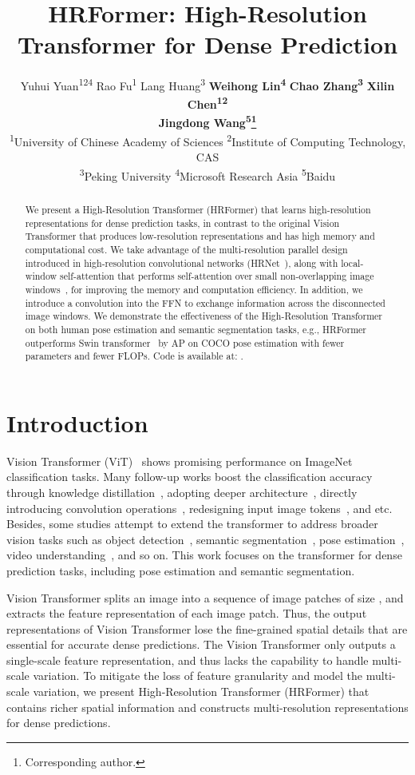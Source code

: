 \documentclass{article}
\title{HRFormer: High-Resolution Transformer for Dense Prediction}
\author{
Yuhui Yuan\textsuperscript{124}
\enskip \enskip 
Rao Fu\textsuperscript{1}
\enskip \enskip
Lang Huang\textsuperscript{3}
\enskip \enskip 
\textbf{Weihong Lin\textsuperscript{4}}
\enskip \enskip 
\textbf{Chao Zhang\textsuperscript{3}}
\enskip \enskip 
\textbf{Xilin Chen\textsuperscript{12}}
\enskip \enskip \\
\textbf{Jingdong Wang\textsuperscript{5}\thanks{Corresponding author.}}
\\
\textsuperscript{1}University of Chinese Academy of Sciences
\enskip\enskip\enskip
\textsuperscript{2}Institute of Computing Technology, CAS \\
\enskip\enskip\enskip
\textsuperscript{3}Peking University
\enskip\enskip\enskip
\textsuperscript{4}Microsoft Research Asia
\enskip\enskip\enskip
\textsuperscript{5}Baidu
}
\begin{document}
\maketitle

\begin{abstract}
  We present a High-Resolution Transformer (HRFormer) that learns high-resolution representations for dense prediction tasks,
  in contrast to the original
  Vision Transformer that produces low-resolution representations and has high memory and computational cost.
  We take advantage of the multi-resolution parallel design introduced in high-resolution convolutional networks (HRNet~\cite{WangSCJDZLMTWLX19}), along with local-window self-attention that performs self-attention over small non-overlapping image windows~\cite{huang2019interlaced}, for improving the memory and computation efficiency.
  In addition, we introduce a convolution into the FFN to exchange information across the disconnected image windows.
  We demonstrate the effectiveness of the High-Resolution Transformer on both human pose estimation and semantic segmentation tasks,
  e.g., HRFormer outperforms Swin transformer~\cite{liu2021swin} by  AP on COCO pose estimation with  fewer parameters and  fewer FLOPs.
  Code is available at: {\footnotesize{}}.
\end{abstract}


\section{Introduction}
Vision Transformer (ViT)~\cite{dosovitskiy2020image} shows promising performance on ImageNet classification tasks.
Many follow-up works boost the classification accuracy through knowledge distillation~\cite{touvron2020deit}, adopting deeper architecture~\cite{touvron2021going}, directly introducing convolution operations~\cite{graham2021levit,wu2021cvt}, redesigning input image tokens~\cite{yuan2021tokens}, and etc.
Besides, some studies attempt to extend the transformer to address
broader vision tasks such as object detection~\cite{carion2020end}, semantic segmentation~\cite{SETR,Ranftl2021}, pose estimation~\cite{yang2020transpose,li2021pose}, video understanding~\cite{zhang2021multiscale,bertasius2021spacetime,neimark2021video}, and so on. This work focuses on the transformer for dense prediction tasks, including pose estimation and semantic segmentation.


Vision Transformer splits an image into a sequence of image patches of size , and extracts the feature representation of each image patch. Thus, the output representations of Vision Transformer lose the fine-grained spatial details that are essential for accurate dense predictions.
The Vision Transformer only outputs a single-scale feature representation,
and thus lacks the capability to
handle multi-scale variation.
To mitigate the loss of feature granularity and model the multi-scale variation,
we present High-Resolution Transformer (HRFormer) that contains
richer spatial information and constructs multi-resolution representations
for dense predictions.
\end{document}
